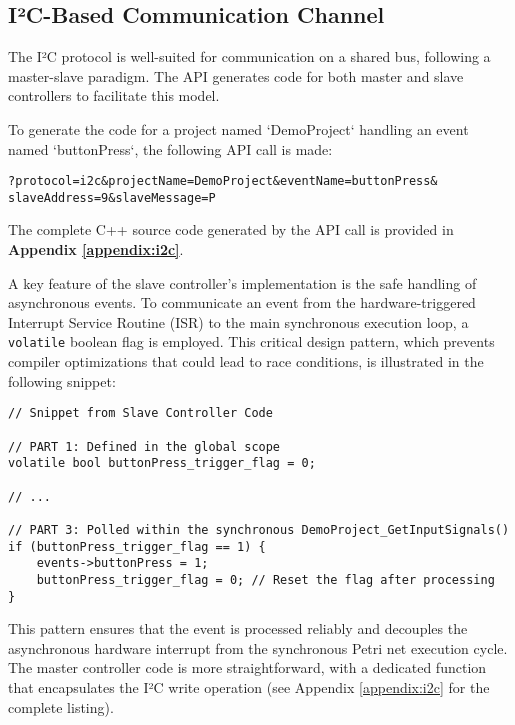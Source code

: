 \subsection{I²C-Based Communication Channel}
\label{subsec:i2c_analysis}

The I²C protocol is well-suited for communication on a shared bus, following a master-slave paradigm. The API generates code for both master and slave controllers to facilitate this model.

To generate the code for a project named `DemoProject` handling an event named `buttonPress`, the following API call is made:
\begin{verbatim}
?protocol=i2c&projectName=DemoProject&eventName=buttonPress&
slaveAddress=9&slaveMessage=P
\end{verbatim}

The complete C++ source code generated by the API call is provided in \textbf{Appendix \ref{appendix:i2c}}.

A key feature of the slave controller's implementation is the safe handling of asynchronous events. To communicate an event from the hardware-triggered Interrupt Service Routine (ISR) to the main synchronous execution loop, a \texttt{volatile} boolean flag is employed. This critical design pattern, which prevents compiler optimizations that could lead to race conditions, is illustrated in the following snippet:

\begin{verbatim}
// Snippet from Slave Controller Code 

// PART 1: Defined in the global scope
volatile bool buttonPress_trigger_flag = 0;

// ...

// PART 3: Polled within the synchronous DemoProject_GetInputSignals()
if (buttonPress_trigger_flag == 1) {
    events->buttonPress = 1;
    buttonPress_trigger_flag = 0; // Reset the flag after processing
}
\end{verbatim}
This pattern ensures that the event is processed reliably and decouples the asynchronous hardware interrupt from the synchronous Petri net execution cycle. The master controller code is more straightforward, with a dedicated function that encapsulates the I²C write operation (see Appendix \ref{appendix:i2c} for the complete listing).

